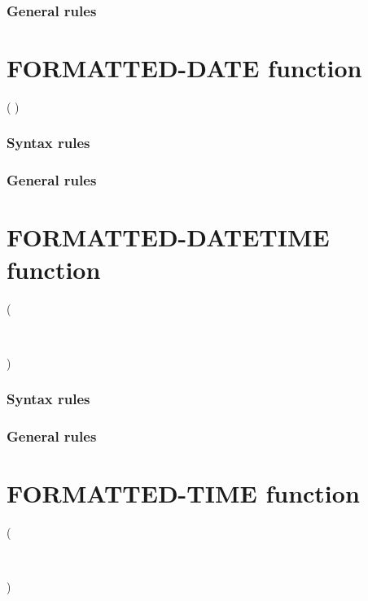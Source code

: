 \subsubsection{General rules}

\section{FORMATTED-DATE function}

\begin{syntax}
    ( \argument \argument)
\end{syntax}

\subsubsection{Syntax rules}

\subsubsection{General rules}

\section{FORMATTED-DATETIME function}

\begin{syntax}
   

  ( \argument \argument \argument
  \begin{0-1}
    \argument \\
  \end{0-1}
  )
\end{syntax}

\subsubsection{Syntax rules}

\subsubsection{General rules}

\section{FORMATTED-TIME function}

\begin{syntax}
    ( \argument \argument
  \begin{0-1}
    \argument \\
  \end{0-1}
  )
\end{syntax}

